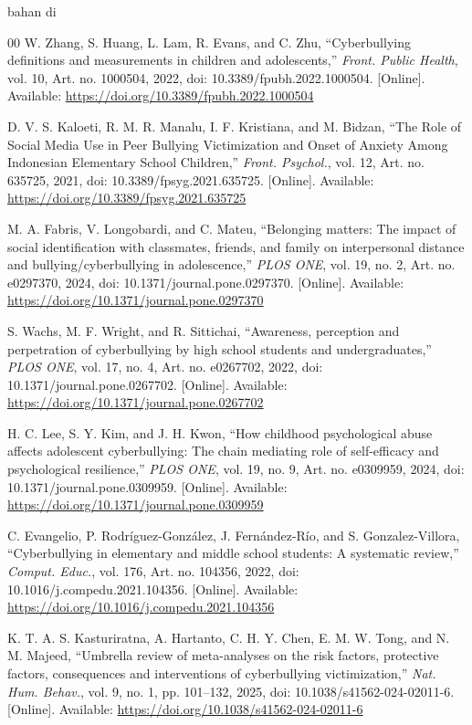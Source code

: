 bahan di\documentclass[conference]{IEEEtran}
\begin{document}
\begin{thebibliography}{00}
W. Zhang, S. Huang, L. Lam, R. Evans, and C. Zhu, ``Cyberbullying definitions and measurements in children and adolescents,'' \textit{Front. Public Health}, vol. 10, Art. no. 1000504, 2022, doi: 10.3389/fpubh.2022.1000504. [Online]. Available: \url{https://doi.org/10.3389/fpubh.2022.1000504}

D. V. S. Kaloeti, R. M. R. Manalu, I. F. Kristiana, and M. Bidzan, ``The Role of Social Media Use in Peer Bullying Victimization and Onset of Anxiety Among Indonesian Elementary School Children,'' \textit{Front. Psychol.}, vol. 12, Art. no. 635725, 2021, doi: 10.3389/fpsyg.2021.635725. [Online]. Available: \url{https://doi.org/10.3389/fpsyg.2021.635725}

M. A. Fabris, V. Longobardi, and C. Mateu, ``Belonging matters: The impact of social identification with classmates, friends, and family on interpersonal distance and bullying/cyberbullying in adolescence,'' \textit{PLOS ONE}, vol. 19, no. 2, Art. no. e0297370, 2024, doi: 10.1371/journal.pone.0297370. [Online]. Available: \url{https://doi.org/10.1371/journal.pone.0297370}

S. Wachs, M. F. Wright, and R. Sittichai, ``Awareness, perception and perpetration of cyberbullying by high school students and undergraduates,'' \textit{PLOS ONE}, vol. 17, no. 4, Art. no. e0267702, 2022, doi: 10.1371/journal.pone.0267702. [Online]. Available: \url{https://doi.org/10.1371/journal.pone.0267702}

H. C. Lee, S. Y. Kim, and J. H. Kwon, ``How childhood psychological abuse affects adolescent cyberbullying: The chain mediating role of self-efficacy and psychological resilience,'' \textit{PLOS ONE}, vol. 19, no. 9, Art. no. e0309959, 2024, doi: 10.1371/journal.pone.0309959. [Online]. Available: \url{https://doi.org/10.1371/journal.pone.0309959}

C. Evangelio, P. Rodríguez-González, J. Fernández-Río, and S. Gonzalez-Villora, ``Cyberbullying in elementary and middle school students: A systematic review,'' \textit{Comput. Educ.}, vol. 176, Art. no. 104356, 2022, doi: 10.1016/j.compedu.2021.104356. [Online]. Available: \url{https://doi.org/10.1016/j.compedu.2021.104356}

K. T. A. S. Kasturiratna, A. Hartanto, C. H. Y. Chen, E. M. W. Tong, and N. M. Majeed, ``Umbrella review of meta-analyses on the risk factors, protective factors, consequences and interventions of cyberbullying victimization,'' \textit{Nat. Hum. Behav.}, vol. 9, no. 1, pp. 101--132, 2025, doi: 10.1038/s41562-024-02011-6. [Online]. Available: \url{https://doi.org/10.1038/s41562-024-02011-6}


\end{thebibliography}
\end{document}
